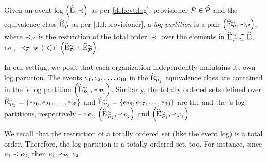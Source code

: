 \begin{newj}
\begin{definition}\label{def:partition}
	Given an event log $\left( \widehat{\mathrm{E}}, \prec \right)$ as per \cref{def:evt:log}, provisioner $\mathcal{P} \in \widehat{\mathcal{P}}$ and the equivalence class $\widehat{\mathrm{E}}^{\sim}_{\mathcal{P}}$ as per \cref{def:provisioner}, a \emph{log partition} is a pair $\left( \widehat{\mathrm{E}}^{\sim}_{\mathcal{P}}, \prec_{\mathcal{P}} \right)$, where $\prec_{\mathcal{P}}$ is the restriction of the total order $\prec$ over the elements in $\widehat{\mathrm{E}}^{\sim}_{\mathcal{P}} \subseteq \widehat{\mathrm{E}}$, i.e., $\;\prec_{\mathcal{P}}$ is $(\prec) \cap \left(\widehat{\mathrm{E}}^{\sim}_{\mathcal{P}} \times \widehat{\mathrm{E}}^{\sim}_{\mathcal{P}}\right)$.
\end{definition}
%
In our setting, we posit that each organization independently maintains its own log partition. The events  $e_{1}, e_{2}, \ldots, e_{19}$ in the  $\widehat{\mathrm{E}}^{\sim}_{\mathcal{P}_{1}}$ equivalence class are contained in the 's log partition  $\left( \widehat{\mathrm{E}}^{\sim}_{\mathcal{P}_{1}}, \prec_{\mathcal{P}_{1}} \right)$. Similarly, the totally ordered sets defined over $\widehat{\mathrm{E}}^{\sim}_{\mathcal{P}_{2}} = \left\{e_{20}, e_{21}, \ldots, e_{25} \right\}$ and $\widehat{\mathrm{E}}^{\sim}_{\mathcal{P}_{3}} = \left\{ e_{26}, e_{27}, \ldots, e_{30} \right\}$ are the  and the 's log partitions, respectively -- i.e., $\left( \widehat{\mathrm{E}}^{\sim}_{\mathcal{P}_{2}}, \prec_{\mathcal{P}_{2}} \right)$ and  $\left( \widehat{\mathrm{E}}^{\sim}_{\mathcal{P}_{3}}, \prec_{\mathcal{P}_{3}} \right)$. 

We recall that the restriction of a totally ordered set (like the event log) is a total order. Therefore, the log partition is a totally ordered set, too. For instance, since $e_1 \prec e_2$, then $e_1 \prec_{\mathcal{P}_{1}} e_2$. %


\end{newj}

